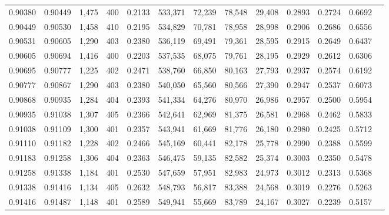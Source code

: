\begin{tabular}{rrrrrrrrrrrrr}
0.90380 & 0.90449 & 1,475 & 400 &                                     0.2133 & 533,371 &  72,239 &  78,548 &  29,408 & 0.2893 & 0.2724 & 0.6692 \\
0.90449 & 0.90530 & 1,458 & 410 &                                     0.2195 & 534,829 &  70,781 &  78,958 &  28,998 & 0.2906 & 0.2686 & 0.6556 \\
0.90531 & 0.90605 & 1,290 & 403 &                                     0.2380 & 536,119 &  69,491 &  79,361 &  28,595 & 0.2915 & 0.2649 & 0.6437 \\
0.90605 & 0.90694 & 1,416 & 400 &                                     0.2203 & 537,535 &  68,075 &  79,761 &  28,195 & 0.2929 & 0.2612 & 0.6306 \\
0.90695 & 0.90777 & 1,225 & 402 &                                     0.2471 & 538,760 &  66,850 &  80,163 &  27,793 & 0.2937 & 0.2574 & 0.6192 \\
0.90777 & 0.90867 & 1,290 & 403 &                                     0.2380 & 540,050 &  65,560 &  80,566 &  27,390 & 0.2947 & 0.2537 & 0.6073 \\
0.90868 & 0.90935 & 1,284 & 404 &                                     0.2393 & 541,334 &  64,276 &  80,970 &  26,986 & 0.2957 & 0.2500 & 0.5954 \\
0.90935 & 0.91038 & 1,307 & 405 &                                     0.2366 & 542,641 &  62,969 &  81,375 &  26,581 & 0.2968 & 0.2462 & 0.5833 \\
0.91038 & 0.91109 & 1,300 & 401 &                                     0.2357 & 543,941 &  61,669 &  81,776 &  26,180 & 0.2980 & 0.2425 & 0.5712 \\
0.91110 & 0.91182 & 1,228 & 402 &                                     0.2466 & 545,169 &  60,441 &  82,178 &  25,778 & 0.2990 & 0.2388 & 0.5599 \\
0.91183 & 0.91258 & 1,306 & 404 &                                     0.2363 & 546,475 &  59,135 &  82,582 &  25,374 & 0.3003 & 0.2350 & 0.5478 \\
0.91258 & 0.91338 & 1,184 & 401 &                                     0.2530 & 547,659 &  57,951 &  82,983 &  24,973 & 0.3012 & 0.2313 & 0.5368 \\
0.91338 & 0.91416 & 1,134 & 405 &                                     0.2632 & 548,793 &  56,817 &  83,388 &  24,568 & 0.3019 & 0.2276 & 0.5263 \\
0.91416 & 0.91487 & 1,148 & 401 &                                     0.2589 & 549,941 &  55,669 &  83,789 &  24,167 & 0.3027 & 0.2239 & 0.5157 \\

\end{tabular}
